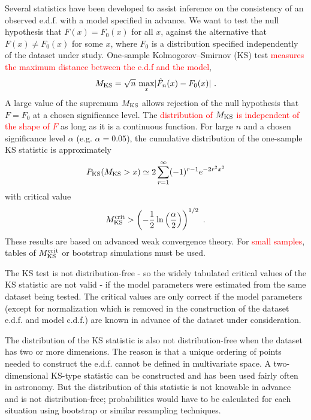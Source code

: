 \documentclass[12pt,a4paper]{article}
\newcounter{theo}[section]\setcounter{theo}{0}
\begin{document}
Several statistics have been developed to assist inference on the consistency of an observed e.d.f. with a model specified in advance. We want to test the null hypothesis that $F(x) = F_0(x)$ for all $x$, against the alternative that $F(x) \neq F_0(x)$ for some $x$, where $F_0$ is a distribution specified independently of the dataset under study.
One-sample Kolmogorov–Smirnov (KS) test \textcolor{red}{measures the maximum distance between the e.d.f and the model},
\begin{equation}
M_{\rm KS} = \sqrt{n}~ \underset{x}\max |\hat{F}_n(x) - F_0(x)| ~.
\end{equation}
A large value of the supremum $M_{\rm KS}$ allows rejection of the null hypothesis that $F = F_0$ at a chosen significance level. The \textcolor{red}{distribution of $M_{\rm KS}$ is independent of the shape of $F$} as long as it is a continuous function. For large $n$ and a chosen significance level $\alpha$ (e.g. $\alpha = 0.05$), the cumulative distribution of the one-sample KS statistic is approximately
\begin{equation}
P_{\rm KS}(M_{\rm KS} > x) \simeq 2 \sum_{r=1}^\infty (-1)^{r-1} e^{-2r^2x^2} 
\end{equation}
with critical value
\begin{equation}
M_{\rm KS}^{\rm crit} > \left(-\frac{1}{2} \ln\left(\frac{\alpha}{2} \right) \right)^{1/2} ~.
\end{equation}
These results are based on advanced weak convergence theory. For \textcolor{red}{small samples}, tables of $M_{\rm KS}^{\rm crit}$ or bootstrap simulations must be used.


The KS test is not distribution-free - so the widely tabulated critical values of the KS statistic are not valid - if the model parameters were estimated from the same dataset being tested. The critical values are only correct if the model parameters (except for normalization which is removed in the construction of the dataset e.d.f. and model c.d.f.) are known in advance of the dataset under consideration.

The distribution of the KS statistic is also not distribution-free when the dataset has two or more dimensions. The reason is that a unique ordering of points needed to construct the e.d.f. cannot be defined in multivariate space. A two-dimensional KS-type statistic can be constructed and has been used fairly often in astronomy. But the distribution of this statistic is not knowable in advance and is not distribution-free; probabilities would have to be calculated for each situation using bootstrap or similar resampling techniques.
\end{document}
